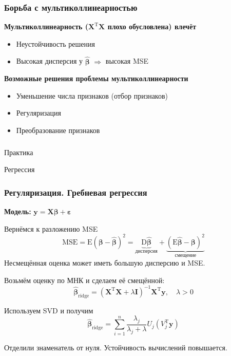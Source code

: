 \documentclass[ucs, notheorems, handout]{beamer}
\newcommand{\betah}{\hat{\bm \beta}}
\newcommand{\betaa}{\bm{\beta}}
\newcommand{\epss}{\bm{\varepsilon}}
\newcommand{\E}{\mathrm{E}}
\newcommand{\XT}{{\bm{X}}^{\mathrm{T}}}
\newcommand{\X}{\bm{X}}
\begin{document}
\begin{frame}
    \frametitle{Борьба с мультиколлинеарностью}
\begin{centering}
	\textbf{Мультиколлинеарность ($\XT \X$ плохо обусловлена) влечёт}
\end{centering}

\begin{itemize}
	\item Неустойчивость решения
	\item Высокая дисперсия у $\betah$ $\Rightarrow$ высокая MSE
\end{itemize}
\vspace{0.5cm}
\begin{centering}
	\textbf{Возможные решения проблемы мультиколлинеарности}
\end{centering}


\begin{itemize}
	\item Уменьшение числа признаков (отбор признаков)
	\item Регуляризация
	\item Преобразование признаков
\end{itemize}
\end{frame}


\begin{frame}
    \frametitle{}

\begin{center}
	\huge {Практика}
	
	\large {Регрессия}
\end{center}

\end{frame}


\begin{frame}
    \frametitle{Регуляризация. Гребневая регрессия}
    \textbf{Модель:} $\bm y = \X \betaa + \epss$
	
	Вернёмся к разложению MSE	
$$\mathrm{MSE} = \E(\betaa - \betah)^2 = \underbrace{\mathrm D \betah}_{\text{дисперсия}} + \underbrace{(\mathrm E \betah - \betaa)^2}_{\text{смещение}}$$
Несмещённая оценка может иметь большую дисперсию и MSE.
	
	Возьмём оценку по МНК и сделаем её смещённой:
	$$\betah_{\text{ridge}} = (\XT \X + \lambda \mathbf I)^{-1}\XT\bm y,\quad \lambda > 0$$
	
	Используем SVD и получим
	$$\betah_{\text{ridge}} = \sum_{i = 1}^n \frac{\lambda_j}{\lambda_j + \lambda} U_j(V_j^\mathrm T\bm y)$$

	Отделили знаменатель от нуля. Устойчивость вычислений повышается.

    \note{
	
    }
\end{frame}
\end{document}
